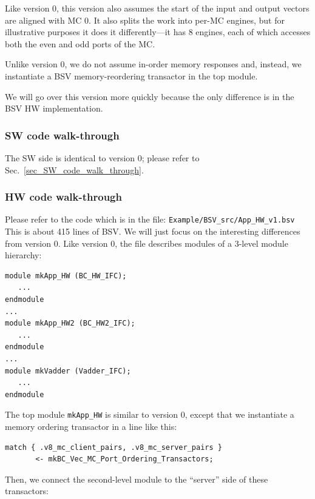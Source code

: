 \documentclass[twoside,letterpaper,11pt]{article}
\newcommand{\hm}{\hspace*{1em}}
\begin{document}
Like version 0, this version also assumes the start of the input and
output vectors are aligned with MC 0.  It also splits the work into
per-MC engines, but for illustrative purposes it does it
differently---it has 8 engines, each of which accesses both the even
and odd ports of the MC.

Unlike version 0, we do not assume in-order memory responses and,
instead, we instantiate a BSV memory-reordering transactor in the top
module.

We will go over this version more quickly because the only difference
is in the BSV HW implementation.


\subsubsection{SW code walk-through}

The SW side is identical to version 0; please refer to
Sec.~\ref{sec_SW_code_walk_through}.


\subsubsection{HW code walk-through}

Please refer to the code which is in the file: \hm \verb|Example/BSV_src/App_HW_v1.bsv| \\
This is about 415 lines of BSV. We will just focus on the interesting differences from version 0.
Like version 0, the file describes modules of a 3-level module hierarchy:

\begin{Verbatim}[frame=single, label=App\_HW\_v1.bsv] 
module mkApp_HW (BC_HW_IFC);
   ...
endmodule
...
module mkApp_HW2 (BC_HW2_IFC);
   ...
endmodule
...
module mkVadder (Vadder_IFC);
   ...
endmodule
\end{Verbatim}

The top module \verb|mkApp_HW| is similar to version 0, except that we
instantiate a memory ordering transactor in a line like this:
\begin{Verbatim}[frame=single, label=App\_HW\_v1.bsv] 
   match { .v8_mc_client_pairs, .v8_mc_server_pairs }
       <- mkBC_Vec_MC_Port_Ordering_Transactors;
\end{Verbatim}

Then, we connect the second-level module to the ``server'' side of
these transactors:
\end{document}
